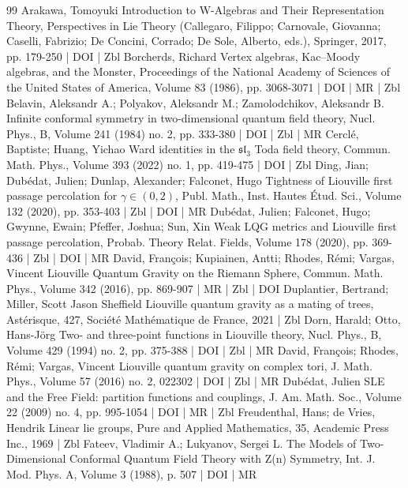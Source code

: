 \documentclass[10pt]{amsart}
\theoremstyle{definition}\newtheorem{defi}[theo]{Definition}\newtheorem{rema}[theo]{Remark}\newtheorem{exam}[theo]{Example}\newtheorem{exem}[theo]{Example}\newtheorem{nota}[theo]{Notation}
\begin{document}
\begin{thebibliography}{99}
Arakawa, Tomoyuki Introduction to W-Algebras and Their Representation Theory, Perspectives in Lie Theory (Callegaro, Filippo; Carnovale, Giovanna; Caselli, Fabrizio; De Concini, Corrado; De Sole, Alberto, eds.), Springer, 2017, pp. 179-250 | DOI | Zbl
Borcherds, Richard Vertex algebras, Kac–Moody algebras, and the Monster, Proceedings of the National Academy of Sciences of the United States of America, Volume 83 (1986), pp. 3068-3071 | DOI | MR | Zbl
Belavin, Aleksandr A.; Polyakov, Aleksandr M.; Zamolodchikov, Aleksandr B. Infinite conformal symmetry in two-dimensional quantum field theory, Nucl. Phys., B, Volume 241 (1984) no. 2, pp. 333-380 | DOI | Zbl | MR
Cerclé, Baptiste; Huang, Yichao Ward identities in the $\mathfrak{sl}_3$ Toda field theory, Commun. Math. Phys., Volume 393 (2022) no. 1, pp. 419-475 | DOI | Zbl
Ding, Jian; Dubédat, Julien; Dunlap, Alexander; Falconet, Hugo Tightness of Liouville first passage percolation for $\gamma \in (0,2)$, Publ. Math., Inst. Hautes Étud. Sci., Volume 132 (2020), pp. 353-403 | Zbl | DOI | MR
Dubédat, Julien; Falconet, Hugo; Gwynne, Ewain; Pfeffer, Joshua; Sun, Xin Weak LQG metrics and Liouville first passage percolation, Probab. Theory Relat. Fields, Volume 178 (2020), pp. 369-436 | Zbl | DOI | MR
David, François; Kupiainen, Antti; Rhodes, Rémi; Vargas, Vincent Liouville Quantum Gravity on the Riemann Sphere, Commun. Math. Phys., Volume 342 (2016), pp. 869-907 | MR | Zbl | DOI
Duplantier, Bertrand; Miller, Scott Jason Sheffield Liouville quantum gravity as a mating of trees, Astérisque, 427, Société Mathématique de France, 2021 | Zbl
Dorn, Harald; Otto, Hans-Jörg Two- and three-point functions in Liouville theory, Nucl. Phys., B, Volume 429 (1994) no. 2, pp. 375-388 | DOI | Zbl | MR
David, François; Rhodes, Rémi; Vargas, Vincent Liouville quantum gravity on complex tori, J. Math. Phys., Volume 57 (2016) no. 2, 022302 | DOI | Zbl | MR
Dubédat, Julien SLE and the Free Field: partition functions and couplings, J. Am. Math. Soc., Volume 22 (2009) no. 4, pp. 995-1054 | DOI | MR | Zbl
Freudenthal, Hans; de Vries, Hendrik Linear lie groups, Pure and Applied Mathematics, 35, Academic Press Inc., 1969 | Zbl
Fateev, Vladimir A.; Lukyanov, Sergei L. The Models of Two-Dimensional Conformal Quantum Field Theory with Z(n) Symmetry, Int. J. Mod. Phys. A, Volume 3 (1988), p. 507 | DOI | MR

\end{thebibliography}
\end{document}
